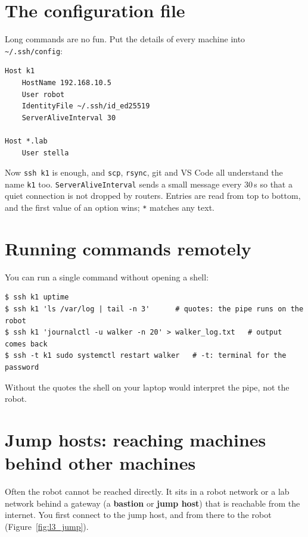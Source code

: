 \section*{The configuration file}
Long commands are no fun. Put the details of every machine into \texttt{\textasciitilde/.ssh/config}:
\begin{verbatim}
Host k1
    HostName 192.168.10.5
    User robot
    IdentityFile ~/.ssh/id_ed25519
    ServerAliveInterval 30

Host *.lab
    User stella
\end{verbatim}
Now \verb|ssh k1| is enough, and \texttt{scp}, \texttt{rsync}, git and VS Code all understand the name \texttt{k1} too. \texttt{ServerAliveInterval} sends a small message every $30$\,s so that a quiet connection is not dropped by routers. Entries are read from top to bottom, and the first value of an option wins; \texttt{*} matches any text.

\section*{Running commands remotely}
You can run a single command without opening a shell:
\begin{verbatim}
$ ssh k1 uptime
$ ssh k1 'ls /var/log | tail -n 3'      # quotes: the pipe runs on the robot
$ ssh k1 'journalctl -u walker -n 20' > walker_log.txt   # output comes back
$ ssh -t k1 sudo systemctl restart walker   # -t: terminal for the password
\end{verbatim}
Without the quotes the shell on your laptop would interpret the pipe, not the robot.

\section*{Jump hosts: reaching machines behind other machines}
Often the robot cannot be reached directly. It sits in a robot network or a lab network behind a gateway (a \textbf{bastion} or \textbf{jump host}) that is reachable from the internet. You first connect to the jump host, and from there to the robot (Figure~\ref{fig:l3_jump}).

